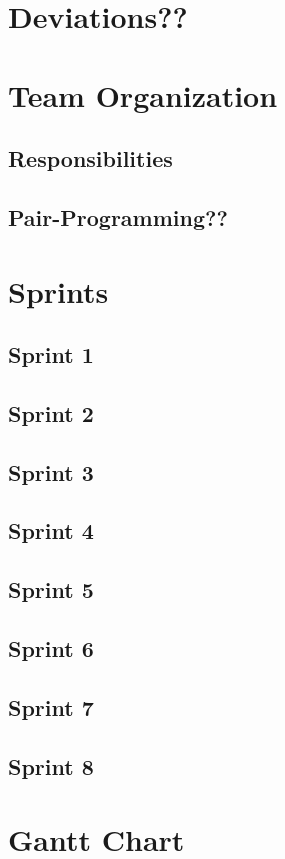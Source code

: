 \section{Deviations??}

\section{Team Organization}
\subsection{Responsibilities}
\subsection{Pair-Programming??}

\section{Sprints}
\subsection*{Sprint 1}
\subsection*{Sprint 2}
\subsection*{Sprint 3}
\subsection*{Sprint 4}
\subsection*{Sprint 5}
\subsection*{Sprint 6}
\subsection*{Sprint 7}
\subsection*{Sprint 8}

\section{Gantt Chart}